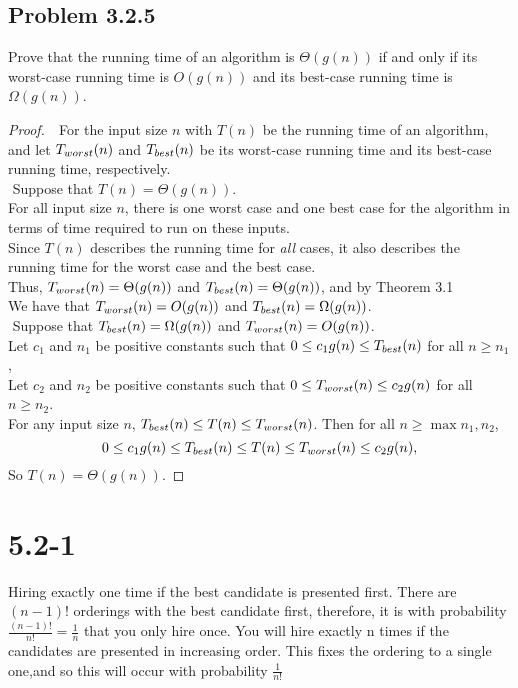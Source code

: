 \documentclass{article}
\begin{document}
\subsection*{Problem 3.2.5}
Prove that the running time of an algorithm is $ \Theta(g(n)) $ if and only if its worst-case
running time is $ O(g(n)) $ and its best-case running time is $ \Omega(g(n)) $.
\begin{proof}
    $ $\newline
    $ $\newline
    For the input size $n$ with $T(n)$ be the running time of an algorithm, 
    and let $T_{worst}(n)$ and $T_{best}(n)$ be its worst-case running time and its best-case running time, respectively. \\
    $ $\newline
    Suppose that $T(n)=\Theta(g(n))$. \\
    For all input size $n$, there is one worst case and one best case for the algorithm 
    in terms of time required to run on these inputs. \\
    Since $T(n)$ describes the running time for \emph{all} cases, it also describes the 
    running time for the worst case and the best case. \\
    Thus, $T_{worst}(n)=\Theta(g(n))$ and $T_{best}(n)=\Theta(g(n))$, and by Theorem 3.1 \\
    We have that $T_{worst}(n)=O(g(n))$ and $T_{best}(n)=\Omega(g(n))$. \\
    $ $\newline
    Suppose that $T_{best}(n)=\Omega(g(n))$ and $T_{worst}(n)=O(g(n))$. \\
    Let $c_1$ and $n_1$ be positive constants such that $0\le c_1g(n)\le T_{best}(n)$ for all $n\ge n_1$, \\
    Let $c_2$ and $n_2$ be positive constants such that $0\le T_{worst}(n)\le c_2g(n)$ for all $n\ge n_2$. \\
    For any input size $n$, $T_{best}(n)\le T(n)\le T_{worst}(n)$.
    Then for all $n\ge\max{n_1,n_2}$,
    \[
        0 \le c_1g(n) \le T_{best}(n) \le T(n) \le T_{worst}(n) \le c_2g(n),
    \]
    So $T(n)=\Theta(g(n))$.
\end{proof}

\section{5.2-1}

Hiring exactly one time if the best candidate is presented first. There are $(n-1)!$ orderings with the best candidate first, therefore, it is with probability $\frac{(n-1)!}{n!} = \frac{1}{n}$ that you only hire once. You will hire exactly n times if the candidates are presented in increasing order. This fixes the ordering to a single one,and so this will occur with probability $\frac{1}{n!}$
\end{document}
